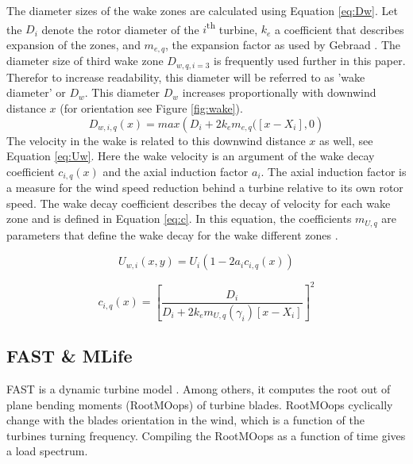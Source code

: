 The diameter sizes of the wake zones are calculated using Equation \ref{eq:Dw}. Let the $D_i$ denote the rotor diameter of the $i${\textsuperscript{th}} turbine, $k_e$ a coefficient that describes expansion of the zones, and $m_{e,q}$, the expansion factor as used by Gebraad \cite{Gebraad2016}. The diameter size of third wake zone $D_{w,q,i=3}$ is frequently used further in this paper. Therefor to increase readability, this diameter will be referred to as 'wake diameter' or $D_w$. This diameter $D_w$ increases proportionally with downwind distance $x$ (for orientation see Figure \ref{fig:wake}).
\begin{equation}
\label{eq:Dw}
D_{w,i,q}(x) = max({D_i + 2k_em_{e,q}([x - X_i],0} )
\end{equation}
The velocity in the wake is related to this downwind distance $x$ as well, see Equation \ref{eq:Uw}. Here the wake velocity is an argument of the wake decay coefficient $c_{i,q}(x)$ and the axial induction factor $a_i$. The axial induction factor is a measure for the wind speed reduction behind a turbine relative to its own rotor speed. The wake decay coefficient describes the decay of velocity for each wake zone and is defined in Equation \ref{eq:c}. In this equation, the coefficients $m_{U,q}$ are parameters that define the wake decay for the wake different zones \cite{Gebraad2016}.

\begin{equation}
\label{eq:Uw}
U_{w,i}(x,y) = U_i\left( {1-2a_{i}c_{i,q}(x)} \right)
\end{equation} 

\begin{equation}
\label{eq:c}
c_{i,q}(x) = \left[ \frac{D_i}{D_i + 2k_em_{U,q}(\gamma_i)[x - X_i]} \right]^2
\end{equation}



\subsection{FAST \& MLife} \label{sec:fast} FAST is a dynamic turbine model \cite{Jonkman2005}. Among others, it computes the root out of plane bending moments (RootMOops) of turbine blades. RootMOops cyclically change with the blades orientation in the wind, which is a function of the turbines turning frequency. Compiling the RootMOops as a function of time gives a load spectrum.

